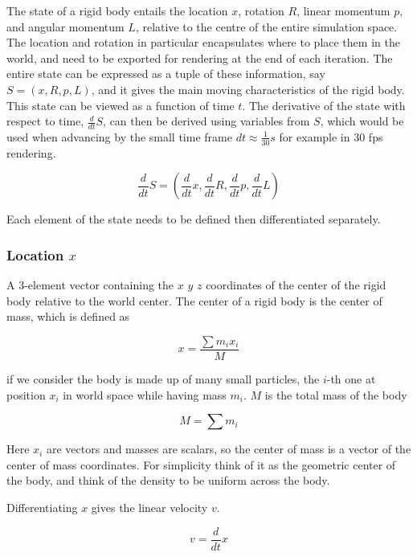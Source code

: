\documentclass[runningheads]{llncs}
\begin{document}
The state of a rigid body entails the location $x$, rotation $R$, linear momentum $p$, and angular momentum $L$, relative to the centre of the entire simulation space. The location and rotation in particular encapsulates where to place them in the world, and need to be exported for rendering at the end of each iteration. The entire state can be expressed as a tuple of these information, say $S = (x, R, p, L)$, and it gives the main moving characteristics of the rigid body. This state can be viewed as a function of time $t$. The derivative of the state with respect to time, $\frac{d}{dt}S$, can then be derived using variables from $S$, which would be used when advancing by the small time frame $dt \approx \frac{1}{30}s$ for example in 30 fps rendering.

\begin{equation}
\frac{d}{dt}S = (\frac{d}{dt}x, \frac{d}{dt}R, \frac{d}{dt}p, \frac{d}{dt}L)
\end{equation}

Each element of the state needs to be defined then differentiated separately.

\subsubsection{Location $x$} 

A 3-element vector containing the $x$ $y$ $z$ coordinates of the center of the rigid body relative to the world center. The center of a rigid body is the center of mass, which is defined as

\begin{equation}
x=\frac{\sum{m_i}{x_i}}{M}
\end{equation}

if we consider the body is made up of many small particles, the $i$-th one at position $x_i$ in world space while having mass $m_i$. $M$ is the total mass of the body

\begin{equation}
M=\sum{m_i}
\end{equation}

Here $x_i$ are vectors and masses are scalars, so the center of mass is a vector of the center of mass coordinates. For simplicity think of it as the geometric center of the body, and think of the density to be uniform across the body.

Differentiating $x$ gives the linear velocity $v$.

\begin{equation}
v = \frac{d}{dt}x
\end{equation}
\end{document}
